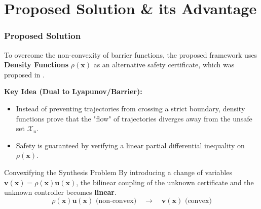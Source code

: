 \documentclass[8pt, hyperref={bookmarks=false},aspectratio=169, xcolor=table]{beamer}
\begin{document}
\section{Proposed Solution \& its Advantage}
\begin{frame}\frametitle{Proposed Solution}
  To overcome the non-convexity of barrier functions, the proposed framework uses \textbf{Density Functions} $\rho(\mathbf{x})$ as an alternative safety certificate, which was proposed in \cite{Rantzer2004}.
  
  \vspace{0.3cm}
  \textbf{Key Idea (Dual to Lyapunov/Barrier):}
  \begin{itemize}
    \item Instead of preventing trajectories from crossing a strict boundary, density functions prove that the "flow" of trajectories diverges away from the unsafe set $\mathcal{X}_u$.
    \item Safety is guaranteed by verifying a linear partial differential inequality on $\rho(\mathbf{x})$.
  \end{itemize}
  
  \vspace{0.3cm}
  \begin{block}{Convexifying the Synthesis Problem}
    By introducing a change of variables $\mathbf{v}(\mathbf{x}) = \rho(\mathbf{x}) \mathbf{u}(\mathbf{x})$, the bilinear coupling of the unknown certificate and the unknown controller becomes \textbf{linear}.
    \begin{equation*}
      \rho(\mathbf{x}) \mathbf{u}(\mathbf{x}) \text{ (non-convex)} \quad \longrightarrow \quad \mathbf{v}(\mathbf{x}) \text{ (convex)}
    \end{equation*}
  \end{block}
\end{frame}
\end{document}
